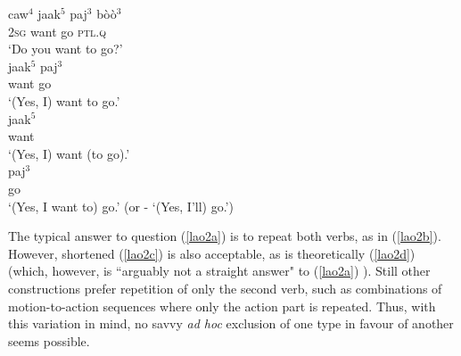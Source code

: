 \ea \label{lao2}
\ea \label{lao2a}
\gll caw$^4$ jaak$^5$ paj$^3$ bòò$^3$ \\
\textsc{2}\textsc{sg} want go \textsc{ptl}.\textsc{q} \\
\glft `Do you want to go?' \\ 
\ex \label{lao2b}
\gll jaak$^5$ paj$^3$ \\
want go \\
\glft `(Yes, I) want to go.' \\
\ex \label{lao2c}
\gll jaak$^5$ \\
want \\
\glft `(Yes, I) want (to go).' \\ 
\ex \label{lao2d}
\gll paj$^3$ \\ 
go \\
\glft `(Yes, I want to) go.' (or - `(Yes, I'll) go.')\\ 
\z
\z

The typical answer to question (\ref{lao2a}) is to repeat both verbs, as in (\ref{lao2b}). However, shortened (\ref{lao2c}) is also acceptable, as is theoretically (\ref{lao2d}) (which, however, is ``arguably not a straight answer" to (\ref{lao2a}) \citep[107]{enfield2008verbs}). Still other constructions prefer  repetition of only the second verb, such as combinations of motion-to-action sequences where only the action part is repeated. Thus, with this variation in mind, no savvy \textit{ad hoc} exclusion of one type in favour of another seems possible.

